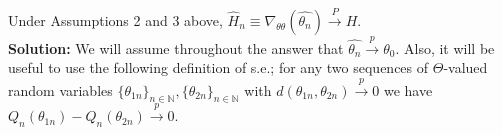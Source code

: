 \documentclass[11pt,letterpaper]{article}                  %
\begin{document}
\bigskip
\begin{problem}
\end{problem}

\bigskip
\begin{problem}
\end{problem}

\bigskip
\begin{problem}
Under Assumptions 2 and 3 above, $\hat{H}_n \equiv \nabla_{\theta\theta}(\widehat{\theta_n}) \overset{P}{\rightarrow} H$.\\

\textbf{Solution:} We will assume throughout the answer that $\widehat{\theta_n}\overset{p}{\rightarrow}\theta_0$. Also, it will be useful to use the following definition of s.e.; for any two sequences of $\Theta$-valued random variables $\{\theta_{1n}\}_{n\in\mathbb{N}}, \{\theta_{2n}\}_{n\in\mathbb{N}}$ with $d(\theta_{1n},\theta_{2n})\overset{p}{\rightarrow}0$ we have $Q_n(\theta_{1n}) - Q_n(\theta_{2n})\overset{p}{\rightarrow}0$.
\end{problem}
\end{document}
